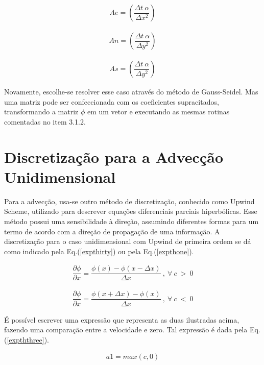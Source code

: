\begin{align}
\label{expttsix}
Ae =  \left( \dfrac{\Delta t \ \alpha}{\Delta x^2} \right)
\end{align}

\begin{align}
\label{exptteight}
An =  \left( \dfrac{\Delta t \ \alpha}{\Delta y^2} \right)
\end{align}

\begin{align}
\label{expttnine}
As =  \left( \dfrac{\Delta t \ \alpha}{\Delta y^2} \right)
\end{align}

	Novamente, escolhe-se resolver esse caso através do método de Gauss-Seidel. Mas uma matriz pode ser confeccionada com os coeficientes supracitados, transformando a matriz $\phi$ em um vetor e executando as mesmas rotinas comentadas no item 3.1.2.

\newpage

\section{Discretização para a Advecção Unidimensional}

\noindent

	Para a advecção, usa-se outro método de discretização, conhecido como Upwind Scheme, utilizado para descrever equações diferenciais parciais hiperbólicas. Esse método possui uma sensibilidade à direção, assumindo diferentes formas para um termo de acordo com a direção de propagação de uma informação.
	A discretização para o caso unidimensional com Upwind de primeira ordem se dá como indicado pela Eq.(\ref{expthirty}) ou pela Eq.(\ref{expthone}).
	
\begin{align}
\label{expthirty}
\dfrac{\partial \phi}{\partial x} = \dfrac{\phi(x)-\phi(x-\Delta x)}{\Delta x} \ ,\  \forall \ c \ > \ 0
\end{align}

\begin{align}
\label{expthone}
\dfrac{\partial \phi}{\partial x} = \dfrac{\phi(x + \Delta x)-\phi(x)}{\Delta x} \ ,\  \forall \ c \ < \ 0
\end{align}

	É possível escrever uma expressão que representa as duas ilustradas acima, fazendo uma comparação entre a velocidade e zero. Tal expressão é dada pela Eq.(\ref{expththree}).

\begin{align}
\label{expthtwo}
a1 = max (c,0)
\end{align}

